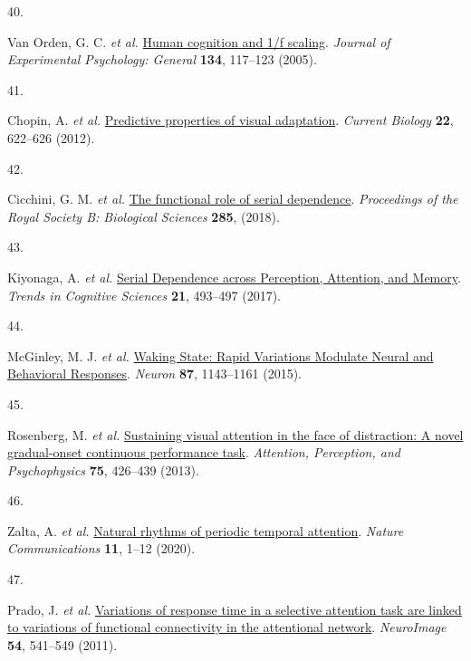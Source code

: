 \documentclass[
]{article}
\newlength{\cslhangindent}
\newlength{\csllabelwidth}
\newlength{\cslentryspacingunit} %
\newenvironment{CSLReferences}[2] %
 {%
  \setlength{\parindent}{0pt}
  \ifodd #1
  \let\oldpar\par
  \def\par{\hangindent=\cslhangindent\oldpar}
  \fi
  \setlength{\parskip}{#2\cslentryspacingunit}
 }%
 {}
\newcommand{\CSLLeftMargin}[1]{\parbox[t]{\csllabelwidth}{#1}}
\newcommand{\CSLRightInline}[1]{\parbox[t]{\linewidth - \csllabelwidth}{#1}\break}
\begin{document}
\begin{CSLReferences}{0}{0}
\leavevmode{}%
\CSLLeftMargin{40. }%
\CSLRightInline{Van Orden, G. C. \emph{et al.}
\href{https://doi.org/10.1037/0096-3445.134.1.117}{{Human cognition and
1/f scaling}}. \emph{Journal of Experimental Psychology: General}
\textbf{134}, 117--123 (2005).}

\leavevmode{}%
\CSLLeftMargin{41. }%
\CSLRightInline{Chopin, A. \emph{et al.}
\href{https://doi.org/10.1016/j.cub.2012.02.021}{{Predictive properties
of visual adaptation}}. \emph{Current Biology} \textbf{22}, 622--626
(2012).}

\leavevmode{}%
\CSLLeftMargin{42. }%
\CSLRightInline{Cicchini, G. M. \emph{et al.}
\href{https://doi.org/10.1098/rspb.2018.1722}{{The functional role of
serial dependence}}. \emph{Proceedings of the Royal Society B:
Biological Sciences} \textbf{285}, (2018).}

\leavevmode{}%
\CSLLeftMargin{43. }%
\CSLRightInline{Kiyonaga, A. \emph{et al.}
\href{https://doi.org/10.1016/j.tics.2017.04.011}{{Serial Dependence
across Perception, Attention, and Memory}}. \emph{Trends in Cognitive
Sciences} \textbf{21}, 493--497 (2017).}

\leavevmode{}%
\CSLLeftMargin{44. }%
\CSLRightInline{McGinley, M. J. \emph{et al.}
\href{https://doi.org/10.1016/j.neuron.2015.09.012}{{Waking State: Rapid
Variations Modulate Neural and Behavioral Responses}}. \emph{Neuron}
\textbf{87}, 1143--1161 (2015).}

\leavevmode{}%
\CSLLeftMargin{45. }%
\CSLRightInline{Rosenberg, M. \emph{et al.}
\href{https://doi.org/10.3758/s13414-012-0413-x}{{Sustaining visual
attention in the face of distraction: A novel gradual-onset continuous
performance task}}. \emph{Attention, Perception, and Psychophysics}
\textbf{75}, 426--439 (2013).}

\leavevmode{}%
\CSLLeftMargin{46. }%
\CSLRightInline{Zalta, A. \emph{et al.}
\href{https://doi.org/10.1038/s41467-020-14888-8}{{Natural rhythms of
periodic temporal attention}}. \emph{Nature Communications} \textbf{11},
1--12 (2020).}

\leavevmode{}%
\CSLLeftMargin{47. }%
\CSLRightInline{Prado, J. \emph{et al.}
\href{https://doi.org/10.1016/j.neuroimage.2010.08.022}{{Variations of
response time in a selective attention task are linked to variations of
functional connectivity in the attentional network}}. \emph{NeuroImage}
\textbf{54}, 541--549 (2011).}


\end{CSLReferences}
\end{document}
